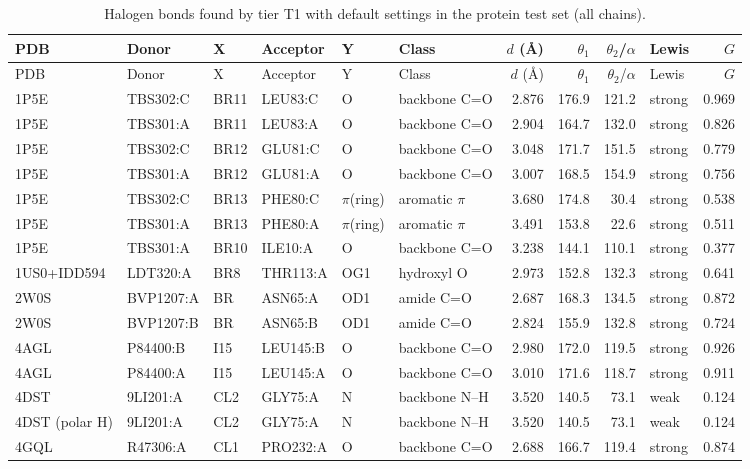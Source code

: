 {\scriptsize
\setlength{\tabcolsep}{3pt}
\begin{longtable}{lllllp{1.9cm}rrrlr}
\caption{Halogen bonds found by tier T1 with default settings in the protein test set (all chains).}\label{tab:protT1}\\
\toprule
PDB & Donor & X & Acceptor & Y & Class & $d$ (\AA) & $\theta_1$ & $\theta_2$/$\alpha$ & Lewis & $G$\\
\midrule
\endfirsthead
\toprule
PDB & Donor & X & Acceptor & Y & Class & $d$ (\AA) & $\theta_1$ & $\theta_2$/$\alpha$ & Lewis & $G$\\
\midrule
\endhead
\bottomrule
\endlastfoot
1P5E & TBS302:C & BR11 & LEU83:C & O & backbone C=O & 2.876 & 176.9 & 121.2 & strong & 0.969\\
1P5E & TBS301:A & BR11 & LEU83:A & O & backbone C=O & 2.904 & 164.7 & 132.0 & strong & 0.826\\
1P5E & TBS302:C & BR12 & GLU81:C & O & backbone C=O & 3.048 & 171.7 & 151.5 & strong & 0.779\\
1P5E & TBS301:A & BR12 & GLU81:A & O & backbone C=O & 3.007 & 168.5 & 154.9 & strong & 0.756\\
1P5E & TBS302:C & BR13 & PHE80:C & $\pi$(ring) & aromatic $\pi$ & 3.680 & 174.8 & 30.4 & strong & 0.538\\
1P5E & TBS301:A & BR13 & PHE80:A & $\pi$(ring) & aromatic $\pi$ & 3.491 & 153.8 & 22.6 & strong & 0.511\\
1P5E & TBS301:A & BR10 & ILE10:A & O & backbone C=O & 3.238 & 144.1 & 110.1 & strong & 0.377\\
1US0+IDD594 & LDT320:A & BR8 & THR113:A & OG1 & hydroxyl O & 2.973 & 152.8 & 132.3 & strong & 0.641\\
2W0S & BVP1207:A & BR & ASN65:A & OD1 & amide C=O & 2.687 & 168.3 & 134.5 & strong & 0.872\\
2W0S & BVP1207:B & BR & ASN65:B & OD1 & amide C=O & 2.824 & 155.9 & 132.8 & strong & 0.724\\
4AGL & P84400:B & I15 & LEU145:B & O & backbone C=O & 2.980 & 172.0 & 119.5 & strong & 0.926\\
4AGL & P84400:A & I15 & LEU145:A & O & backbone C=O & 3.010 & 171.6 & 118.7 & strong & 0.911\\
4DST & 9LI201:A & CL2 & GLY75:A & N & backbone N--H & 3.520 & 140.5 & 73.1 & weak & 0.124\\
4DST (polar H) & 9LI201:A & CL2 & GLY75:A & N & backbone N--H & 3.520 & 140.5 & 73.1 & weak & 0.124\\
4GQL & R47306:A & CL1 & PRO232:A & O & backbone C=O & 2.688 & 166.7 & 119.4 & strong & 0.874\\
\end{longtable}}
